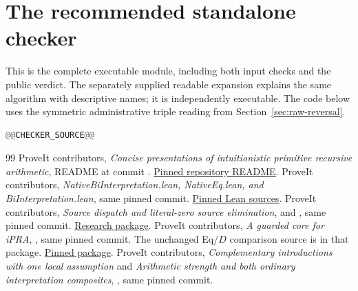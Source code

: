 \clearpage
\section{The recommended standalone checker}
\label{app:code}

This is the complete executable module, including both input checks and
the public verdict. The separately supplied readable expansion explains
the same algorithm with descriptive names; it is independently executable.
The code below uses the symmetric administrative triple reading from
Section~\ref{sec:raw-reversal}.
\begin{lstlisting}[language=Python]
@@CHECKER_SOURCE@@
\end{lstlisting}

\begin{thebibliography}{99}
\footnotesize
{} ProveIt contributors,
\emph{Concise presentations of intuitionistic primitive recursive arithmetic},
README at commit .
\href{https://github.com/VladimirReshetnikov/ProveIt/blob/1517d9d79ce33f631e0f82960c849427cbba23bf/Logic/PrimitiveRecursiveArithmetic/ConciseIPRA/README.md}{Pinned repository README}.
 ProveIt contributors,
\emph{NativeBiInterpretation.lean, NativeEq.lean, and BiInterpretation.lean},
same pinned commit.
\href{https://github.com/VladimirReshetnikov/ProveIt/tree/1517d9d79ce33f631e0f82960c849427cbba23bf/Logic/PrimitiveRecursiveArithmetic/ConciseIPRA/Lean/ConciseIPRA}{Pinned Lean sources}.
 ProveIt contributors,
\emph{Source dispatch and literal-zero source elimination},
 and ,
same pinned commit.
\href{https://github.com/VladimirReshetnikov/ProveIt/tree/1517d9d79ce33f631e0f82960c849427cbba23bf/Logic/PrimitiveRecursiveArithmetic/ConciseIPRA/Research/source_dispatch}{Research package}.
 ProveIt contributors, \emph{A guarded core for iPRA},
, same pinned commit. The unchanged Eq/$D$
comparison source is  in that package.
\href{https://github.com/VladimirReshetnikov/ProveIt/tree/1517d9d79ce33f631e0f82960c849427cbba23bf/Logic/PrimitiveRecursiveArithmetic/ConciseIPRA/Research/guarded_core}{Pinned package}.
 ProveIt contributors,
\emph{Complementary introductions with one local assumption} and
\emph{Arithmetic strength and both ordinary interpretation composites},
, same pinned commit.

\end{thebibliography}
